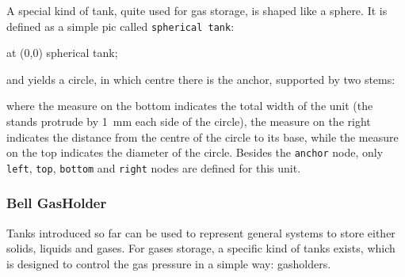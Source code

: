 \documentclass[12pt]{article}						%
\newcommand*{\chpn}[1]{\texttt{#1}}				%
\newcommand*{\chpp}[1]{\texttt{#1}}				%
\begin{document}
A special kind of tank, quite used for gas storage, is shaped like a sphere. It
is defined as a simple pic called \chpp{spherical tank}:
\begin{chpcode}
	\pic at (0,0) {spherical tank};
\end{chpcode}
and yields a circle, in which centre there is the anchor, supported by two stems:
\begin{center}
\end{center}
where the measure on the bottom indicates the total width of the unit (the stands
protrude by \SI{1}{\mm} each side of the circle), the measure on the right
indicates the distance from the centre of the circle to its base, while the
measure on the top indicates the diameter of the circle. Besides the
\chpn{anchor} node, only \chpn{left}, \chpn{top}, \chpn{bottom} and \chpn{right}
nodes are defined for this unit.

\subsubsection{Bell GasHolder}

Tanks introduced so far can be used to represent general systems to store either
solids, liquids and gases. For gases storage, a specific kind of tanks exists,
which is designed to control the gas pressure in a simple way: gasholders.
\end{document}
